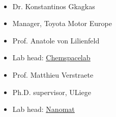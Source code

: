\documentclass[10pt,a4paper,ragged2e,withhyper]{altacv}
\begin{document}
\begin{paracol}{2}
\\



\newpage

\begin{itemize}
\item Dr. Konstantinos Gkagkas \hfill \href{mailto:konstantinos.gkagkas@toyota-europe.com}{\faEnvelope}
\item[] Manager, Toyota Motor Europe 
\item Prof. Anatole von Lilienfeld\hfill \href{mailto:anatole.vonlilienfeld@utoronto.ca}{\faEnvelope}
\item[] Lab head: \href{https://chemspacelab.chem.utoronto.ca}{\underline{Chemspacelab}}
\item Prof. Matthieu Verstraete \hfill \href{mailto:Matthieu.Verstraete@uliege.be}{\faEnvelope}
\item[] Ph.D. supervisor, ULiege
\item[] Lab head: \href{http://www.nanomat.ulg.ac.be/}{\underline{Nanomat}}
\end{itemize}




\end{paracol}
\end{document}
